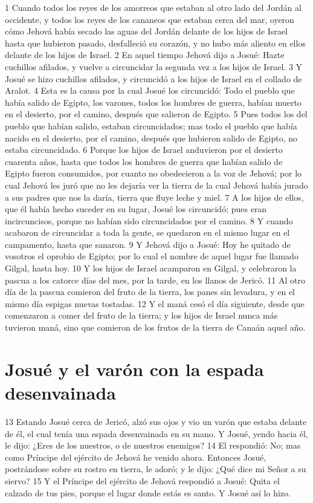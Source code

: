 1 Cuando todos los reyes de los amorreos que estaban al otro lado del Jordán al occidente, y todos los reyes de los cananeos que estaban cerca del mar, oyeron cómo Jehová había secado las aguas del Jordán delante de los hijos de Israel hasta que hubieron pasado, desfalleció su corazón, y no hubo más aliento en ellos delante de los hijos de Israel.
2 En aquel tiempo Jehová dijo a Josué: Hazte cuchillos afilados, y vuelve a circuncidar la segunda vez a los hijos de Israel.
3 Y Josué se hizo cuchillos afilados, y circuncidó a los hijos de Israel en el collado de Aralot.
4 Esta es la causa por la cual Josué los circuncidó: Todo el pueblo que había salido de Egipto, los varones, todos los hombres de guerra, habían muerto en el desierto, por el camino, después que salieron de Egipto.
5 Pues todos los del pueblo que habían salido, estaban circuncidados; mas todo el pueblo que había nacido en el desierto, por el camino, después que hubieron salido de Egipto, no estaba circuncidado.
6 Porque los hijos de Israel anduvieron por el desierto cuarenta años, hasta que todos los hombres de guerra que habían salido de Egipto fueron consumidos, por cuanto no obedecieron a la voz de Jehová; por lo cual Jehová les juró que no les dejaría ver la tierra de la cual Jehová había jurado a sus padres que nos la daría, tierra que fluye leche y miel. 
7 A los hijos de ellos, que él había hecho suceder en su lugar, Josué los circuncidó; pues eran incircuncisos, porque no habían sido circuncidados por el camino.
8 Y cuando acabaron de circuncidar a toda la gente, se quedaron en el mismo lugar en el campamento, hasta que sanaron.
9 Y Jehová dijo a Josué: Hoy he quitado de vosotros el oprobio de Egipto; por lo cual el nombre de aquel lugar fue llamado Gilgal, hasta hoy.
10 Y los hijos de Israel acamparon en Gilgal, y celebraron la pascua a los catorce días del mes, por la tarde, en los llanos de Jericó.
11 Al otro día de la pascua comieron del fruto de la tierra, los panes sin levadura, y en el mismo día espigas nuevas tostadas.
12 Y el maná cesó el día siguiente, desde que comenzaron a comer del fruto de la tierra; y los hijos de Israel nunca más tuvieron maná, sino que comieron de los frutos de la tierra de Canaán aquel año.
\section*{Josué y el varón con la espada desenvainada}

13 Estando Josué cerca de Jericó, alzó sus ojos y vio un varón que estaba delante de él, el cual tenía una espada desenvainada en su mano. Y Josué, yendo hacia él, le dijo: ¿Eres de los nuestros, o de nuestros enemigos?
14 El respondió: No; mas como Príncipe del ejército de Jehová he venido ahora. Entonces Josué, postrándose sobre su rostro en tierra, le adoró; y le dijo: ¿Qué dice mi Señor a su siervo?
15 Y el Príncipe del ejército de Jehová respondió a Josué: Quita el calzado de tus pies, porque el lugar donde estás es santo. Y Josué así lo hizo.


